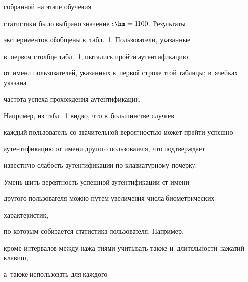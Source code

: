 \renewcommand{\figurename}{\protect\bf Рис.}


\renewcommand{\tablename}{\protect\bf Таблица}





\addtocounter{table}{2}








\noindent


 собранной на этапе обучения 


статистики было выбрано значение $\epsilon\hm=1100$. Результаты 


экспериментов обобщены в~табл.~1. Пользователи, указанные 


в~первом столбце табл.~1, пытались пройти аутентификацию 


от имени пользователей, указанных в~первой строке этой таблицы; в~ячейках указана 


частота успеха прохождения аутентификации.

















Например, из табл.~1 видно, что в~большинстве случаев 


каждый пользователь со значительной вероятностью может пройти успешно 


аутентификацию от имени другого пользователя, что подтверждает 


известную слабость аутентификации по клавиатурному почерку. 


Умень-\linebreak шить вероятность успешной аутентификации от имени 


другого пользователя можно путем увеличения числа биометрических 


характеристик,\linebreak


 по которым собирается статистика пользователя. Например, 


кроме интервалов между нажа-\linebreak тиями учитывать также и~длительности нажатий клавиш, 


а~также использовать для каждого\linebreak



